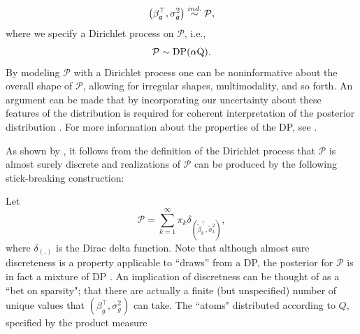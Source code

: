 \begin{equation*}
\left(\beta_g^\top,\sigma^2_g\right) \stackrel{ind.}{\sim} \mathcal{P},
\end{equation*}
where we specify a Dirichlet process on $\mathcal{P}$, i.e.,
\begin{equation*}
\mathcal{P} \sim \operatorname{DP}(\alpha \mbox{Q}).
\end{equation*}
\iftoggle{thesis}{
The use of this prior, due to \citet{ferguson}, is a distribution over probability distributions, such that for any finite disjoint partition $\{A_i\}_{i>=1}^n$ on $\mathbb{R}^p$, $\mathcal{P}$ is a random measure such that the joint distribution $\left(\mathcal{P}(A_1),\ldots,\mathcal{P}(A_n)\right) \sim \op{Dir}\left(\alpha Q(A_1),\ldots,\alpha Q(A_n)\right).$ The Dirichlet process has two parameters: $Q$, the base measure, represents a prior guess at the distribution. $\alpha$, the concentration parameter expresses the degree to which $\mathcal{P}$ will agree with $Q$ on any set $A$. This follows from the definition given above and known properties of the Dirichlet distribution, i.e., $\op{E}\left(\mathcal{P}(A)\right)=Q(A)$, and $\op{V}\left(\mathcal{P}(A)\right)=\frac{Q(A)(1 - Q(A)}{\alpha + 1}$, showing that $\mathcal{P}(A) \stackrel{p}{\rightarrow} Q(A)$ as $\alpha \rightarrow \infty$ for any set $A$.
}{}
By modeling $\mathcal{P}$ with a Dirichlet process one can be noninformative about the overall shape of $\mathcal{P}$, allowing for irregular shapes, multimodality, and so forth. An argument can be made that by incorporating our uncertainty about these features of the distribution is required for coherent interpretation of the posterior distribution \citep{walker2010bayesian}. For more information about the properties of the DP, see \cite{ferguson}.

As shown by \citet{sethuraman}, it follows from the definition of the Dirichlet process that $\mathcal{P}$ is almost surely discrete and realizations of $\mathcal{P}$ can be produced by the following stick-breaking construction:

Let 
\begin{equation}
\label{eq:P}
\mathcal{P} =\sum_{k=1}^\infty \pi_k \delta_{\left(\tilde{\beta}_k^\top ,\tilde{\sigma}^2_k\right)},
\end{equation}
where $\delta_{(.)}$ is the Dirac delta function. Note that although almost sure discreteness is a property applicable to ``draws'' from a DP, the posterior for $\mathcal{P}$ is in fact a mixture of DP \citep{antoniak}. An implication of discretness can be thought of as a ``bet on sparsity"; that there are actually a finite (but unspecified) number of unique values that $(\beta_g^\top,\sigma^2_g)$ can take.  
 The ``atoms" distributed according to $Q$, specified by the product measure

